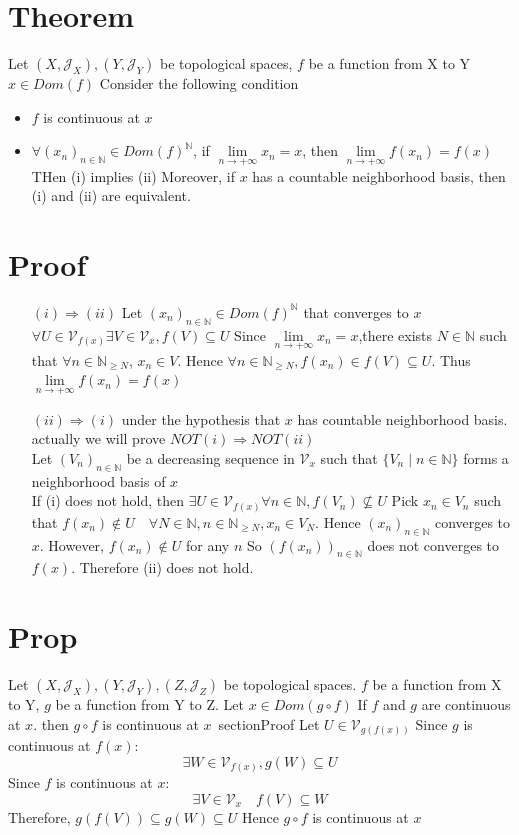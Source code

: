 \documentclass{book}
\begin{document}
\section{Theorem}
Let $(X,\mathcal{J}_X),(Y,\mathcal{J}_Y)$ be topological spaces, $f$ be a function from X to Y $x\in Dom (f)$ Consider the following condition\begin{itemize}
    \item $f$ is continuous at $x$
    \item $\forall(x_n)_{n\in \mathbb{N} }\in Dom(f)^\mathbb{N} $, if $\lim\limits_{n\rightarrow +\infty}x_n=x$, then $\lim\limits_{n\rightarrow+\infty}f(x_n)=f(x)$ THen (i) implies (ii) Moreover, if $x$ has a countable neighborhood basis, then (i) and (ii) are equivalent.
\end{itemize}
\section{Proof}
\begin{itemize}
    \item [$(i)\Rightarrow(ii)$]Let $(x_n)_{n\in \mathbb{N} }\in Dom(f)^\mathbb{N} $ that converges to $x$ $\forall U\in \mathcal{V}_{f(x)}\exists V\in \mathcal{V}_x,f(V)\subseteq U$ Since $\lim\limits_{n\rightarrow+\infty}x_n=x$,there exists $N\in \mathbb{N} $ such that $\forall n\in \mathbb{N} _{\geq N }$, $x_n\in V$. Hence $\forall n\in \mathbb{N} _{\geq N },f(x_n)\in f(V)\subseteq U$. Thus $\lim\limits_{n\rightarrow+\infty}f(x_n)=f(x)$
    \item [$(ii)\Rightarrow(i)$]under the hypothesis that $x$ has countable neighborhood basis. actually we will prove $NOT(i)\Rightarrow NOT(ii)$\\Let $(V_n)_{n\in \mathbb{N} }$ be a decreasing sequence in $\mathcal{V}_x$ such that $\{V_n\mid n\in \mathbb{N} \}$ forms a neighborhood basis of $x$ \\If (i) does not hold, then $\exists U\in \mathcal{V}_{f(x)}\forall n\in \mathbb{N} ,f(V_n)\not\subseteq U$ Pick $x_n\in V_n$ such that $f(x_n)\not\in U\quad \forall N\in \mathbb{N} ,n\in \mathbb{N} _{\geq N}, x_n\in V_N$. Hence $(x_n)_{n\in \mathbb{N} }$ converges to $x$. However, $f(x_n)\not\in U$ for any $n$ So $(f(x_n))_{n\in \mathbb{N} }$ does not converges to $f(x)$. Therefore (ii) does not hold.
\end{itemize}
\section{Prop}
Let $(X,\mathcal{J}_X),(Y,\mathcal{J}_Y),(Z,\mathcal{J}_Z)$ be topological spaces. $f$ be a function from X to Y, $g$ be a function from Y to Z. Let $x\in Dom (g\circ f)$ If $f$ and $g$ are continuous at $x$. then $g\circ f$ is continuous at $x$\
section{Proof}
Let $U\in \mathcal{V}_{g(f(x))}$ Since $g$ is continuous at $f(x)$:$$ \exists W\in \mathcal{V}_{f(x)},g(W)\subseteq U$$ Since $f$ is continuous at $x$:$$\exists V\in \mathcal{V}_x\quad f(V)\subseteq W$$ Therefore, $g(f(V))\subseteq g(W)\subseteq U$ Hence $g\circ f$ is continuous at $x$ 
\end{document}
